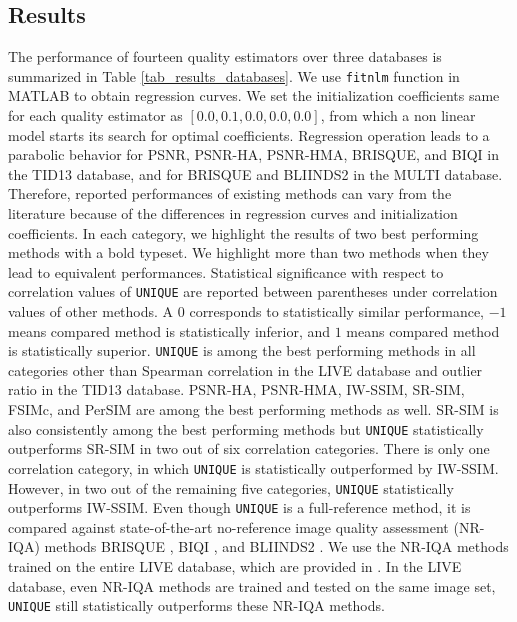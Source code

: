 \documentclass[draftcls,12pt, onecolumn]{IEEEtran}
\begin{document}
\vspace{-12.0mm}


\subsection{Results}
\label{subsec:val_results}
The performance of fourteen quality estimators over three databases is summarized in Table \ref{tab_results_databases}. We use \texttt{fitnlm} function in MATLAB \textsuperscript{\textregistered} to obtain regression curves. We set the initialization coefficients same for each quality estimator  as $[0.0,0.1,0.0,0.0,0.0]$, from  which a non linear model starts its search for optimal coefficients. Regression operation leads to a parabolic behavior for PSNR, PSNR-HA, PSNR-HMA, BRISQUE, and BIQI in the TID13 database, and for BRISQUE and BLIINDS2 in the MULTI database. Therefore, reported performances of existing methods can vary from the literature because of the differences in regression curves and initialization coefficients. In each category, we highlight the results of two best performing methods with a bold typeset. We highlight more than two methods when they lead to equivalent performances. Statistical significance with respect to correlation values of \texttt{UNIQUE} are reported between parentheses under correlation values of other methods. A $0$ corresponds to statistically similar performance, $-1$ means compared method is statistically inferior, and $1$ means compared method is statistically superior. \texttt{UNIQUE} is among the best performing methods in all categories other than Spearman correlation in the LIVE database and outlier ratio in the TID13 database. PSNR-HA, PSNR-HMA, IW-SSIM, SR-SIM, FSIMc, and PerSIM are among the best performing methods as well. SR-SIM is also consistently among the best performing methods but \texttt{UNIQUE} statistically outperforms SR-SIM in two out of six correlation categories. There is only one correlation category, in which \texttt{UNIQUE} is statistically outperformed by IW-SSIM. However, in two out of the remaining five categories, \texttt{UNIQUE} statistically outperforms IW-SSIM. Even though \texttt{UNIQUE} is a full-reference method, it is compared against state-of-the-art no-reference image quality assessment (NR-IQA) methods  BRISQUE \cite{Mittal2012}, BIQI \cite{Moorthy2010}, and BLIINDS2 \cite{Saad2012}. We use the NR-IQA methods trained on the entire LIVE database, which are provided in \cite{LIVEWeb}. In the LIVE database, even NR-IQA methods are trained and tested on the same image set, \texttt{UNIQUE}  still statistically outperforms these NR-IQA methods. 
\end{document}
